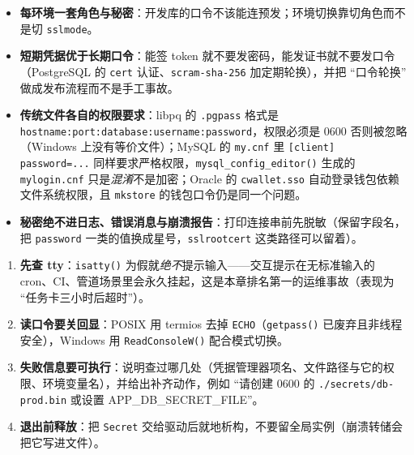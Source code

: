 \documentclass[12pt,a4paper,fontset=fandol]{ctexbook}
\newcommand{\Fn}[1]{\texttt{#1()}}
\newcommand{\Tp}[1]{\texttt{#1}}
\begin{document}
\begin{itemize}
  \item \textbf{每环境一套角色与秘密}：开发库的口令不该能连预发；环境切换靠切角色而不是切 \Tp{sslmode}。
  \item \textbf{短期凭据优于长期口令}：能签 token 就不要发密码，能发证书就不要发口令（PostgreSQL 的 \texttt{cert} 认证、\texttt{scram-sha-256} 加定期轮换），并把 ``口令轮换'' 做成发布流程而不是手工事故。
  \item \textbf{传统文件各自的权限要求}：libpq 的 \Tp{.pgpass} 格式是 \texttt{hostname:\allowbreak port:\allowbreak database:\allowbreak username:\allowbreak password}，权限必须是 0600 否则被忽略（Windows 上没有等价文件）；MySQL 的 \Tp{my.cnf} 里 \texttt{[client] password=...} 同样要求严格权限，\Fn{mysql\_\allowbreak{}config\_\allowbreak{}editor} 生成的 \Tp{mylogin.cnf} 只是\emph{混淆}不是加密；Oracle 的 \Tp{cwallet.sso} 自动登录钱包依赖文件系统权限，且 \Tp{mkstore} 的钱包口令仍是同一个问题。
  \item \textbf{秘密绝不进日志、错误消息与崩溃报告}：打印连接串前先脱敏（保留字段名，把 \texttt{password} 一类的值换成星号，\texttt{sslrootcert} 这类路径可以留着）。
\end{itemize}

\begin{bestpractice}[title=CLI 在缺秘密时的正确行为]
\begin{enumerate}
  \item \textbf{先查 tty}：\Fn{isatty} 为假就\emph{绝不}提示输入——交互提示在无标准输入的 cron、CI、管道场景里会永久挂起，这是本章排名第一的运维事故（表现为 ``任务卡三小时后超时''）。
  \item \textbf{读口令要关回显}：POSIX 用 termios 去掉 \Tp{ECHO}（\Fn{getpass} 已废弃且非线程安全），Windows 用 \Fn{ReadConsoleW} 配合模式切换。
  \item \textbf{失败信息要可执行}：说明查过哪几处（凭据管理器项名、文件路径与它的权限、环境变量名），并给出补齐动作，例如 ``请创建 0600 的 \texttt{./secrets/db-prod.bin} 或设置 APP\_DB\_SECRET\_FILE''。
  \item \textbf{退出前释放}：把 \Tp{Secret} 交给驱动后就地析构，不要留全局实例（崩溃转储会把它写进文件）。
\end{enumerate}
\end{bestpractice}
\end{document}
